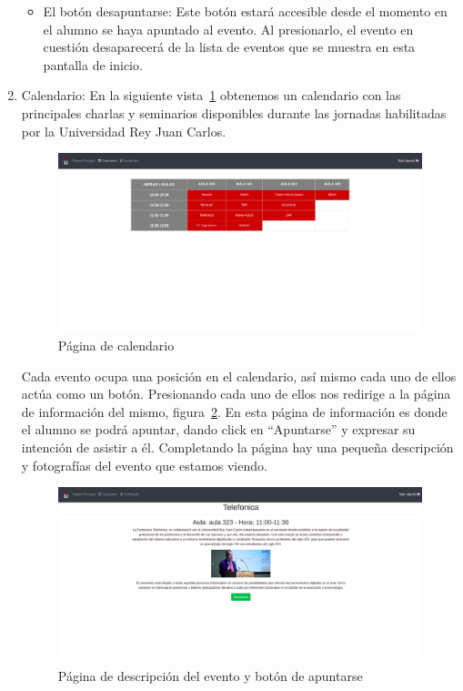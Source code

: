 \documentclass[a4paper, 12pt]{book}
\begin{document}
\begin{enumerate}
\begin{itemize}
 \item El botón desapuntarse: Este botón estará accesible desde el momento en el alumno se haya apuntado al evento. Al presionarlo, el evento en cuestión desaparecerá de la lista de eventos que se muestra en esta pantalla de inicio.
\end{itemize}
 
 \vspace{12cm}
  \item Calendario: En la siguiente vista~\ref{fig:horario} obtenemos un calendario con las principales charlas y seminarios disponibles durante las jornadas habilitadas por la Universidad Rey Juan Carlos. 

\begin{figure}[h!]
  	\centering
  	\includegraphics[width=16cm, keepaspectratio]{img/horario.png}
  	\caption{Página de calendario}\label{fig:horario}
	\end{figure}
  
  Cada evento ocupa una posición en el calendario, así mismo cada uno de ellos actúa como un botón. Presionando cada uno de ellos nos redirige a la página de información del mismo, figura~\ref{fig:descripEvento}. En esta página de información es donde el alumno se podrá apuntar, dando click en ``Apuntarse'' y expresar su intención de asistir a él. Completando la página hay una pequeña descripción y fotografías del evento que estamos viendo.
  
  \begin{figure}[h!]
  	\centering
  	\includegraphics[width=16cm, keepaspectratio]{img/descripEvento.png}
  	\caption{Página de descripción del evento y botón de apuntarse}\label{fig:descripEvento}
	\end{figure}
  

\end{enumerate}
\end{document}
